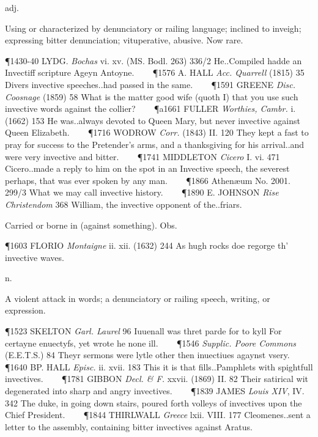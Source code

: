 \begin{description}[wide, labelwidth=!, labelindent=0pt]
\begin{myenumerate}

 adj.

 Using or characterized by denunciatory or railing language; inclined to inveigh; expressing bitter denunciation; vituperative, abusive. Now rare.

\P 1430-40 LYDG.  \textit{Bochas} vi. xv. (MS. Bodl. 263) 336/2 He..Compiled hadde an Invectiff scripture Ageyn Antoyne.    
\P 1576 A. HALL  \textit{Acc. Quarrell} (1815) 35 Divers invective speeches..had passed in the same.    
\P 1591 GREENE  \textit{Disc. Coosnage} (1859) 58 What is the matter good wife (quoth I) that you use such invective words against the collier?    
\P a1661 FULLER  \textit{Worthies, Cambr.} i. (1662) 153 He was..always devoted to Queen Mary, but never invective against Queen Elizabeth.    
\P 1716 WODROW  \textit{Corr.} (1843) II. 120 They kept a fast to pray for success to the Pretender's arms, and a thanksgiving for his arrival..and were very invective and bitter.    
\P 1741 MIDDLETON  \textit{Cicero} I. vi. 471 Cicero..made a reply to him on the spot in an Invective speech, the severest perhaps, that was ever spoken by any man.    
\P 1866 Athenæum  No. 2001. 299/3 What we may call invective history.    
\P 1890 E. JOHNSON  \textit{Rise Christendom} 368 William, the invective opponent of the..friars.

 Carried or borne in (against something). Obs.

\P 1603 FLORIO  \textit{Montaigne} ii. xii. (1632) 244 As hugh rocks doe regorge th' invective waves.

 n.

 A violent attack in words; a denunciatory or railing speech, writing, or expression.

\P 1523 SKELTON  \textit{Garl. Laurel} 96 Iuuenall was thret parde for to kyll For certayne enuectyfs, yet wrote he none ill.    
\P 1546 \textit{Supplic.  Poore Commons} (E.E.T.S.) 84 Theyr sermons were lytle other then inuectiues agaynst vsery.    
\P 1640 BP. HALL  \textit{Episc.} ii. xvii. 183 This it is that fills..Pamphlets with spightfull invectives.    
\P 1781 GIBBON  \textit{Decl. \& F.} xxvii. (1869) II. 82 Their satirical wit degenerated into sharp and angry invectives.    
\P 1839 JAMES  \textit{Louis XIV}, IV. 342 The duke, in going down stairs, poured forth volleys of invectives upon the Chief President.    
\P 1844 THIRLWALL  \textit{Greece} lxii. VIII. 177 Cleomenes..sent a letter to the assembly, containing bitter invectives against Aratus.


\end{myenumerate}
\end{description}
